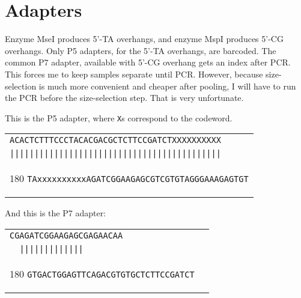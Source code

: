 \documentclass[a4paper,12pt,twosided]{article}
\begin{document}
\section{Adapters
}
Enzyme MseI produces 5'-TA overhangs, and enzyme MspI produces 5'-CG overhangs. Only P5 adapters, for the 5'-TA overhangs, are barcoded. The common P7 adapter, available with 5'-CG overhang gets an index after PCR. This forces me to keep samples separate until PCR. However, because size-selection is much more convenient and cheaper after pooling, I will have to run the PCR before the size-selection step. That is very unfortunate.

This is the P5 adapter, where \texttt{X}s correspond to the codeword.\\

\begin{tabular}{l}
\verb+ACACTCTTTCCCTACACGACGCTCTTCCGATCTXXXXXXXXXX+\\[-4pt]
\verb+|||||||||||||||||||||||||||||||||||||||||||+\\[-10pt]
   \begin{turn}{180}
   \verb+TAxxxxxxxxxxAGATCGGAAGAGCGTCGTGTAGGGAAAGAGTGT+
   \end{turn}
\\
\end{tabular}
\vspace*{0.3cm}

And this is the P7 adapter:\\

%
\begin{tabular}{l}
\verb+CGAGATCGGAAGAGCGAGAACAA+\\[-4pt]
\verb+  |||||||||||||+\\[-10pt]
   \begin{turn}{180}
   \verb+GTGACTGGAGTTCAGACGTGTGCTCTTCCGATCT  +
   \end{turn}
\\
\end{tabular}
\vspace*{0.5cm}
\end{document}
